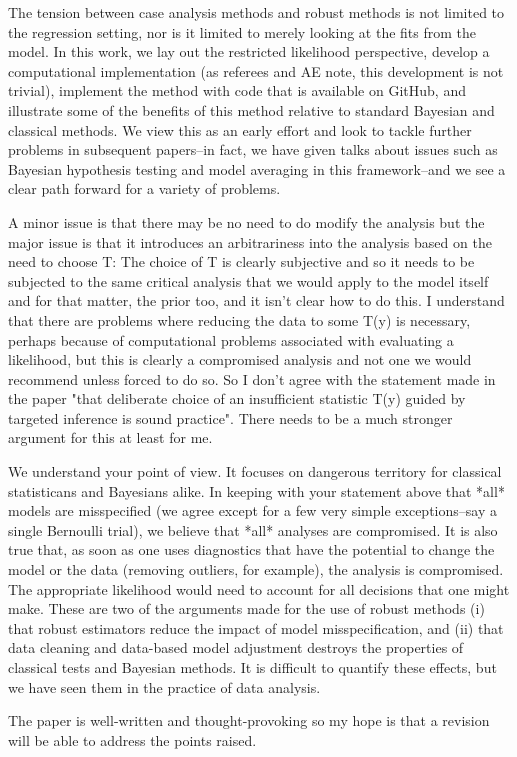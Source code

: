 \documentclass{article}
\newcommand{\response}[1]{{\color{blue}#1}}
\begin{document}
{The tension between case analysis methods and robust methods is not limited to the regression setting, nor is it limited to merely looking at the fits from the model.  In this work, we lay out the restricted likelihood perspective, develop a computational implementation (as referees and AE note, this development is not trivial), implement the method with code that is available on GitHub, and illustrate some of the benefits of this method relative to standard Bayesian and classical methods.  We view this as an early effort and look to tackle further problems in subsequent papers--in fact, we have given talks about issues such as Bayesian hypothesis testing and model averaging in this framework--and we see a clear path forward for a variety of problems.}


A minor issue is that there may be no need to do modify the analysis but the major issue is that it introduces an arbitrariness into the analysis based on the need to choose T: The choice of T is clearly subjective and so it needs to be subjected to the same critical analysis that we would apply to the model itself and for that matter, the prior too, and it isn't clear how to do this. I understand that there are
problems where reducing the data to some T(y) is necessary, perhaps because of computational problems associated with evaluating a likelihood, but this is clearly a compromised analysis and not one we would recommend unless forced to do so. So I don't agree with the statement made in the paper "that deliberate choice of an insufficient statistic T(y) guided by targeted inference is sound practice". There needs to be a much stronger argument for this at least for me.

\response{We understand your point of view.  It focuses on dangerous territory for classical statisticans and Bayesians alike.  In keeping with your statement above that *all* models are misspecified (we agree except for a few very simple exceptions--say a single Bernoulli trial), we believe that *all* analyses are compromised.  It is also true that, as soon as one uses diagnostics that have the potential to change the model or the data (removing outliers, for example), the analysis is compromised.  The appropriate likelihood would need to account for all decisions that one might make.  These are two of the arguments made for the use of robust methods (i) that robust estimators reduce the impact of model misspecification, and (ii) that data cleaning and data-based model adjustment destroys the properties of classical tests and Bayesian methods.  It is difficult to quantify these effects, but we have seen them in the practice of data analysis.}  

The paper is well-written and thought-provoking so my hope is that a revision will be able to address the points raised.



\end{document}
